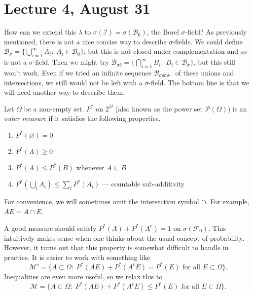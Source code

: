 \documentclass[11pt,fleqn]{book} %
\begin{document}
\section{Lecture 4, August 31}

How can we extend this $\lambda$ to $\sigma(\mathcal{I}) = \sigma(\mathcal{B}_0)$, the Borel $\sigma$-field? As previously mentioned, there is not a nice concise way to describe $\sigma$-fields. We could define $\mathcal{B}_{\sigma} = \{\bigcup_{i=1}^\infty A_i:\;A_i \in \mathcal{B}_0\}$, but this is not closed under complementation and so is not a $\sigma$-field. Then we might try $\mathcal{B}_{\sigma\delta} = \{\bigcap_{i=1}^\infty B_i:\;B_i \in \mathcal{B}_{\sigma}\}$, but this still won't work. Even if we tried an infinite sequence $\mathcal{B}_{\sigma\delta\sigma\delta\cdots}$ of these unions and intersections, we still would not be left with a $\sigma$-field. The bottom line is that we will need another way to describe them.

\begin{definition} \label{def:outer-measure}
	Let $\Omega$ be a non-empty set. $P^*$ on $2^\Omega$ (also known as the power set $\mathcal{P}(\Omega)$) is an \emph{outer measure} if it satisfies the following properties.
	\begin{enumerate}[label=(\Roman*)]
		\item $P^*(\varnothing) = 0$
		\item $P^*(A) \geq 0$
		\item $P^*(A) \leq P^*(B)$ whenever $A \subseteq B$
		\item $P^*(\bigcup_i A_i) \leq \sum_i P^*(A_i)$ --- countable sub-additivity
	\end{enumerate}
\end{definition}

\begin{notation}
	For convenience, we will sometimes omit the intersection symbol $\cap$. For example, $AE = A \cap E$.
\end{notation}

A good measure should satisfy $P^*(A)+P^*(A^c)=1$ on $\sigma(\mathcal{F}_0)$. This intuitively makes sense when one thinks about the usual concept of probability. However, it turns out that this property is somewhat difficult to handle in practice. It is easier to work with something like
\[
	\mathcal{M}' = \{A \subset \Omega:\;P^*(AE)+P^*(A^cE)=P^*(E) \textrm{ for all } E \subset \Omega\}.
\]
Inequalities are even more useful, so we relax this to
\[
	\mathcal{M} = \{A \subset \Omega:\;P^*(AE)+P^*(A^cE) \leq P^*(E) \textrm{ for all } E \subset \Omega\}.
\]
\end{document}
